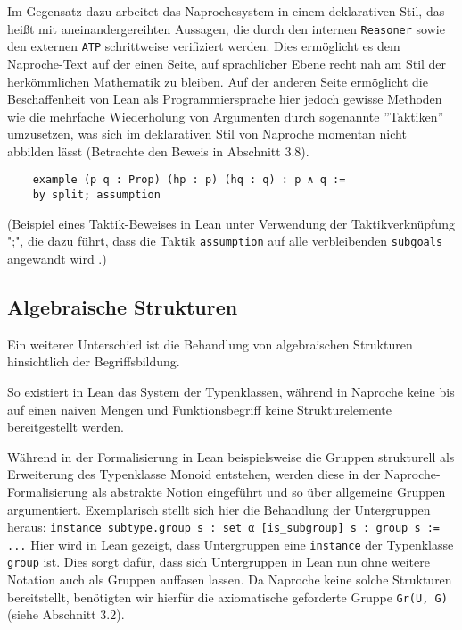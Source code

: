 \documentclass[a4paper,12pt]{scrartcl}
\newcommand{\ls}[1]{\lstinline|#1|}
\begin{document}
Im Gegensatz dazu arbeitet das Naprochesystem in einem deklarativen Stil, das heißt mit aneinandergereihten Aussagen, die durch den internen \verb!Reasoner! sowie den externen \verb!ATP! schrittweise verifiziert werden. Dies ermöglicht es dem Naproche-Text auf der einen Seite, auf sprachlicher Ebene recht nah am Stil der herkömmlichen Mathematik zu bleiben. Auf der anderen Seite ermöglicht die Beschaffenheit von Lean als Programmiersprache hier jedoch gewisse Methoden wie die mehrfache Wiederholung von Argumenten durch sogenannte ''Taktiken'' umzusetzen, was sich im deklarativen Stil von Naproche momentan nicht abbilden lässt (Betrachte den Beweis in Abschnitt 3.8).

\lstset{language=lean}
\begin{lstlisting}
    example (p q : Prop) (hp : p) (hq : q) : p ∧ q :=
    by split; assumption
\end{lstlisting}

(Beispiel eines Taktik-Beweises in Lean unter Verwendung der Taktikverknüpfung ";", die dazu führt, dass die Taktik \lstinline{assumption} auf alle verbleibenden \lstinline{subgoals} angewandt wird \cite{bibtex.e}.)

\subsection{Algebraische Strukturen}

Ein weiterer Unterschied ist die Behandlung von algebraischen Strukturen hinsichtlich der Begriffsbildung.

So existiert in Lean das System der Typenklassen, während in Naproche keine bis auf einen naiven Mengen und Funktionsbegriff keine Strukturelemente bereitgestellt werden.

Während in der Formalisierung in Lean beispielsweise die Gruppen strukturell als Erweiterung des Typenklasse Monoid entstehen, werden diese in der Naproche-Formalisierung als abstrakte Notion eingeführt und so über allgemeine Gruppen argumentiert. Exemplarisch stellt sich hier die Behandlung der Untergruppen heraus:
\lstinline{instance subtype.group s : set α [is_subgroup] s : group s := ...} Hier wird in Lean gezeigt, dass Untergruppen eine \ls{instance} der Typenklasse \ls{group} ist. Dies sorgt dafür, dass sich Untergruppen in Lean nun ohne weitere Notation auch als Gruppen auffasen lassen.
Da Naproche keine solche Strukturen bereitstellt, benötigten wir hierfür die axiomatische geforderte Gruppe \verb!Gr(U, G)! (siehe Abschnitt 3.2).
\end{document}
